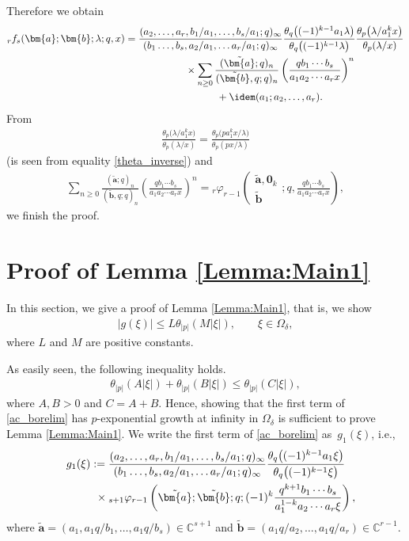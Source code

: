 Therefore we obtain
\begin{gather*}
{}_rf_s(\bm{a};\bm{b};\lambda;q,x)= \frac{(a_2,\ldots,a_r,b_1/a_1,\ldots,b_{s}/a_1;q)_\infty}{(b_1\ldots,b_s,a_2/a_1,\ldots a_r/a_1;q)_\infty}\frac{\theta_q\big((-1)^{k-1}a_1\lambda\big)}{\theta_q\big((-1)^{k-1}\lambda\big)}\frac{\theta_p\big(\lambda/a_1^kx\big)}{\theta_p(\lambda/x)}\\
\hphantom{{}_rf_s(\bm{a};\bm{b};\lambda;q,x)=}{} \times\sum_{n\ge0}\frac{(\tilde{\bm{a}};q)_n}{(\tilde{\bm{b}},q;q)_n}\left(\frac{qb_1\cdots b_s}{a_1a_2\cdots a_rx}\right)^n\\
\hphantom{{}_rf_s(\bm{a};\bm{b};\lambda;q,x)=}{} +\idem(a_1;a_2,\ldots,a_r).
\end{gather*}
From
\begin{gather*}
\frac{\theta_p\big(\lambda/a_1^kx\big)}{\theta_p(\lambda/x)}=\frac{\theta_p\big(pa_1^kx/\lambda\big)}{\theta_p(px/\lambda)}
\end{gather*}
(is seen from equality \eqref{theta_inverse}) and
\begin{gather*}
\sum_{n\ge0}\frac{(\tilde{\bm{a}};q)_n}{(\tilde{\bm{b}},q;q)_n}\left(\frac{qb_1\cdots b_s}{a_1a_2\cdots a_rx}\right)^n={}_r\varphi_{r-1}\left(
\begin{matrix}\tilde{\bm{a}},\bm{0}_k\\
\tilde{\bm{b}}
\end{matrix};q,\frac{qb_1\cdots b_s}{a_1a_2\cdots a_rx}\right),
\end{gather*}
we finish the proof.
\section{Proof of Lemma \ref{Lemma:Main1}}\label{Section:Proof_Lemma:Main1}
In this section, we give a proof of Lemma \ref{Lemma:Main1}, that is, we show
\begin{gather*}
\vert g(\xi)\vert\le L \theta_{\vert p\vert}(M\vert \xi\vert),\qquad \xi\in\Omega_\delta,
\end{gather*}
where $L$ and $M$ are positive constants.

As easily seen, the following inequality holds.
\begin{gather*}
\theta_{|p|}(A|\xi|)+\theta_{|p|}(B|\xi|)\le \theta_{|p|}(C|\xi|),
\end{gather*}
where $A, B>0$ and $C=A+B$. Hence, showing that the first term of \eqref{ac_borelim} has $p$-exponential growth at infinity in $\Omega_\delta$ is sufficient to prove Lemma \ref{Lemma:Main1}. We write the first term of \eqref{ac_borelim} as~$g_1(\xi)$, i.e.,
\begin{gather*}
g_1(\xi):=\frac{(a_2,\ldots,a_r,b_1/a_1,\ldots,b_{s}/a_1;q)_\infty}{(b_1\ldots,b_s,a_2/a_1,\ldots a_r/a_1;q)_\infty}\frac{\theta_q\big((-1)^{k-1}a_1\xi\big)}{\theta_q\big((-1)^{k-1}\xi\big)}\\
\hphantom{g_1(\xi):=}{}\times {}_{s+1}\varphi_{r-1}\left(\tilde{\bm{a}};\tilde{\bm{b}};q;(-1)^k\frac{q^{k+1}b_1\cdots b_s}{a_1^{1-k}a_2\cdots a_r\xi}\right),
\end{gather*}
where $\tilde{\bm{a}}=(a_1,a_1q/b_1,\ldots,a_1q/b_s)\in\mathbb{C}^{s+1}$ and $\tilde{\bm{b}}=(a_1q/a_2,\ldots,a_1q/a_r)\in\mathbb{C}^{r-1}$.

